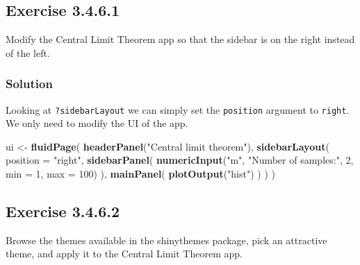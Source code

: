 \documentclass[]{book}
\newenvironment{Shaded}{\begin{snugshade}}{\end{snugshade}}
\newcommand{\DataTypeTok}[1]{\textcolor[rgb]{0.13,0.29,0.53}{#1}}
\newcommand{\DecValTok}[1]{\textcolor[rgb]{0.00,0.00,0.81}{#1}}
\newcommand{\KeywordTok}[1]{\textcolor[rgb]{0.13,0.29,0.53}{\textbf{#1}}}
\newcommand{\NormalTok}[1]{#1}
\newcommand{\StringTok}[1]{\textcolor[rgb]{0.31,0.60,0.02}{#1}}
\begin{document}
\hypertarget{exercise-3.4.6.1}{%
\subsection*{Exercise 3.4.6.1}\label{exercise-3.4.6.1}}

Modify the Central Limit Theorem app so that the sidebar is on the right
instead of the left.

\begin{solution}

\hypertarget{solution-8}{%
\subsubsection*{Solution}\label{solution-8}}

Looking at \texttt{?sidebarLayout} we can simply set the \texttt{position} argument to
\texttt{right}. We only need to modify the UI of the app.

\begin{Shaded}
\begin{Highlighting}[]
\NormalTok{ui <-}\StringTok{ }\KeywordTok{fluidPage}\NormalTok{(}
  \KeywordTok{headerPanel}\NormalTok{(}\StringTok{"Central limit theorem"}\NormalTok{),}
  \KeywordTok{sidebarLayout}\NormalTok{(}
    \DataTypeTok{position =} \StringTok{"right"}\NormalTok{,}
    \KeywordTok{sidebarPanel}\NormalTok{(}
      \KeywordTok{numericInput}\NormalTok{(}\StringTok{"m"}\NormalTok{, }\StringTok{"Number of samples:"}\NormalTok{, }\DecValTok{2}\NormalTok{, }\DataTypeTok{min =} \DecValTok{1}\NormalTok{, }\DataTypeTok{max =} \DecValTok{100}\NormalTok{)}
\NormalTok{    ),}
    \KeywordTok{mainPanel}\NormalTok{(}
      \KeywordTok{plotOutput}\NormalTok{(}\StringTok{"hist"}\NormalTok{)}
\NormalTok{    )}
\NormalTok{  )}
\NormalTok{)}
\end{Highlighting}
\end{Shaded}

\end{solution}

\hypertarget{exercise-3.4.6.2}{%
\subsection*{Exercise 3.4.6.2}\label{exercise-3.4.6.2}}

Browse the themes available in the shinythemes package, pick an attractive
theme, and apply it to the Central Limit Theorem app.
\end{document}
